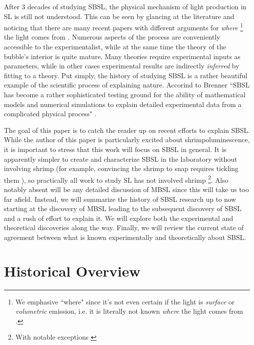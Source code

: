 \documentclass[rmp,aps,nofootinbib,superscriptaddress,floatfix]{revtex4-2}
\begin{document}
After 3 decades of studying SBSL, the physical mechanism of light production in SL is still not understood. This can be seen by glancing at the literature and noticing that there are many recent papers with different arguments for \emph{where} \footnote{We emphasive ``where" since it's not even certain if the light is \emph{surface} or \emph{volumetric} emission, i.e. it is literally not known \emph{where} the light comes from \cite{}.} the light comes from \cite{borisenok2020mechanisms,flannigan2013non,flannigan2012temperature,tatartchenko2017sonoluminescence}. Numerous aspects of the process are conveniently accessible to the experimentalist, while at the same time the theory of the bubble's interior is quite mature. Many theories require experimental inputs as parameters, while in other cases experimental results are indirectly \emph{inferred} by fitting to a theory. Put simply, the history of studying SBSL is a rather beautiful example of the scientific process of explaining nature. Accorind to Brenner ``SBSL has become a rather sophisticated testing ground for the ability of mathematical models and numerical simulations to explain detailed experimental data from a complicated physical process" \cite{brenner2002single}.

The goal of this paper is to catch the reader up on recent efforts to explain SBSL. While the author of this paper is particularly excited about shrimpoluminescence, it is important to stress that this work will focus on SBSL in general. It is apparently simpler to create and characterize SBSL in the laboratory without involving shrimp (for example, convincing the shrimp to snap requires tickling them \cite{lohse2001snapping,versluis2000snapping,lohse2018bubble}), so practically all work to study SL has not involved shrimp \footnote{ With notable exceptions \cite{tang2019bioinspired}}. Also notably absent will be any detailed discussion of MBSL since this will take us too far afield. Instead, we will summarize the history of SBSL research up to now starting at the discovery of MBSL leading to the subsequent discovery of SBSL and a rush of effort to explain it. We will explore both the experimental and theoretical discoveries along the way. Finally, we will review the current state of agreement between what is known experimentally and theoretically about SBSL. 

\section{Historical Overview}
\end{document}
